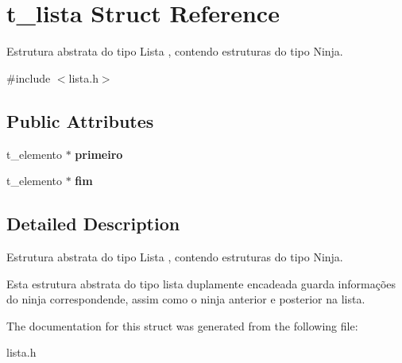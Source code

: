 \hypertarget{structt__lista}{}\section{t\+\_\+lista Struct Reference}
\label{structt__lista}


Estrutura abstrata do tipo Lista , contendo estruturas do tipo Ninja.  




{\ttfamily \#include $<$lista.\+h$>$}

\subsection*{Public Attributes}
\begin{DoxyCompactItemize}
\item 
\mbox{\label{structt__lista_a0e338ff9539b9ce02845f4f3cdc57351}} 
t\+\_\+elemento $\ast$ {\bfseries primeiro}
\item 
\mbox{\label{structt__lista_a72165e67f037f14242f702c4248a843d}} 
t\+\_\+elemento $\ast$ {\bfseries fim}
\end{DoxyCompactItemize}


\subsection{Detailed Description}
Estrutura abstrata do tipo Lista , contendo estruturas do tipo Ninja. 

Esta estrutura abstrata do tipo lista duplamente encadeada guarda informações do ninja correspondende, assim como o ninja anterior e posterior na lista. 

The documentation for this struct was generated from the following file\+:\begin{DoxyCompactItemize}
\item 
lista.\+h\end{DoxyCompactItemize}
